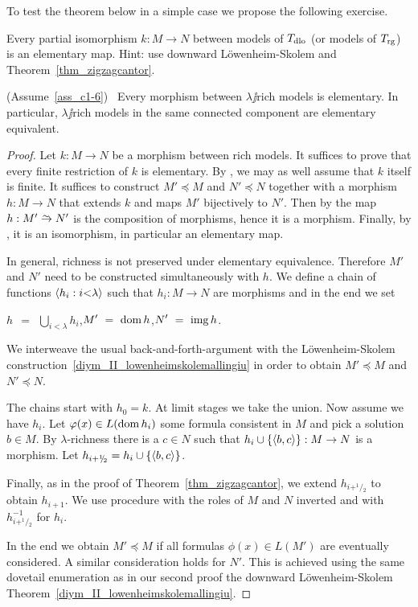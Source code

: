 \documentclass[creche.tex]{subfiles}
\begin{document}
To test the theorem below in a simple case we propose the following exercise.

\begin{exercise}
Every partial isomorphism $k:M\to N$ between models of $T_{\rm dlo}$ (or models of  $T_{\rm rg}$) is an elementary map.
Hint: use downward Löwenheim-Skolem and Theorem~\ref{thm_zigzagcantor}.\QED
\end{exercise}


\begin{theorem}\label{thm_morphism_rich_elementary}
(Assume~\ref{ass_c1-6})  \  Every morphism between $\lambda\jj$rich models is elementary.
In particular, $\lambda\jj$rich models in the same connected component are elementary equivalent.
\end{theorem}

\begin{proof}
Let $k:M\to N$ be a morphism between rich models.
It suffices to prove that every finite restriction of $k$ is elementary.
By , we may as well assume that $k$ itself is finite.
It suffices to construct $M'\preceq M$ and  $N'\preceq N$ together with a morphism $h:M\to N$ that extends $k$ and maps $M'$ bijectively to $N'$.
Then by  the map $h:M'\isomap N'$ is the composition of morphisms, hence it is a morphism.
Finally, by , it is an isomorphism, in particular an elementary map.

In general, richness is not preserved under elementary equivalence.
Therefore $M'$ and $N'$ need to be constructed simultaneously with $h$.
We define a chain of functions $\langle h_i:i{<}\lambda\rangle$ such that $h_i:M\to N$ are mor\-phisms and in the end we set

\hfil  $\displaystyle h\ \ =\ \ \bigcup_{i<\lambda}h_i$,\hfil $\displaystyle M'\ =\ \mathop{\rm dom} h$,\hfil $\displaystyle N'\ =\ \mathop{\rm img} h$.

We interweave the usual back-and-forth-argument with the Löwenheim-Skolem construction~\ref{diym_II_lowenheimskolemallingiu} in order to obtain $M'\preceq M$ and  $N'\preceq N$.

The chains start with $h_0=k$.
At limit stages we take the union.
Now assume we have $h_i$.
Let $\varphi(x)\in L(\mathop{\rm dom} h_i)$ some formula consistent in $M$ and pick a solution $b\in M$.
By $\lambda$-richness there is a $c\in N$ such that $h_i\cup\{\langle b,c\rangle\}:M\to N$ is a morphism.
Let $h_{i+^1\!\!/\!_2}=h_i\cup\{\langle b,c\rangle\}$.

Finally, as in the proof of Theorem~\ref{thm_zigzagcantor}, we extend $h_{i+^1\!\!/\!_2}$ to obtain $h_{i+1}$.
We use procedure with the roles of $M$ and $N$ inverted and with $h^{-1}_{i+^1\!\!/\!_2}$ for $h_i$.

In the end we obtain $M'\preceq M$ if all formulas $\phi(x)\in L(M')$ are eventually considered.
A similar consideration holds for $N'$.
This is achieved using the same dovetail enumeration as in our second proof the downward Löwenheim-Skolem Theorem~\ref{diym_II_lowenheimskolemallingiu}.
\end{proof}
\end{document}
